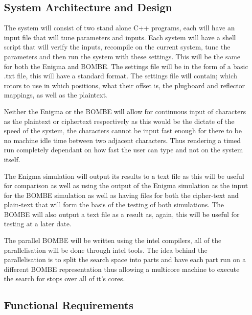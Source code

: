 \documentclass[12pt,a4paper]{article}
\begin{document}
\subsection{System Architecture and Design}

The system will consist of two stand alone C++ programs, each will have an input file that will tune parameters and inputs. Each system will have a shell script that will verify the inputs, recompile on the current system, tune the parameters and then run the system with these settings. This will be the same for both the Enigma and BOMBE. The settings file will be in the form of a basic .txt file, this will have a standard format. The settings file will contain; which rotors to use in which positions, what their offset is, the plugboard and reflector mappings, as well as the plaintext. 

Neither the Enigma or the BOMBE will allow for continuous input of characters as the plaintext or ciphertext respectively as this would be the dictate of the speed of the system, the characters cannot be input fast enough for there to be no machine idle time between two adjacent characters. Thus rendering a timed run completely dependant on how fast the user can type and not on the system itself.

The Enigma simulation will output its results to a text file as this will be useful for comparison as well as using the output of the Enigma simulation as the input for the BOMBE simulation as well as having files for both the cipher-text and plain-text that will form the basis of the testing of both simulations. The BOMBE will also output a text file as a result as, again, this will be useful for testing at a later date. 

The parallel BOMBE will be written using the intel compilers, all of the parallelisation will be done through intel tools. The idea behind the parallelisation is to split the search space into parts and have each part run on a different BOMBE representation thus allowing a multicore machine to execute the search for stops over all of it's cores. 

\subsection{Functional Requirements}
\end{document}
